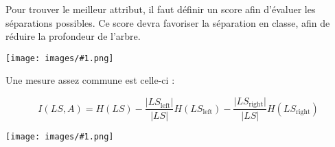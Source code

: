 \documentclass[10pt,a4paper]{report}
\newcommand{\dessin}[1]{\begin{center}\texttt{[image: images/\#1.png]}\end{center}}
\begin{document}
			Pour trouver le meilleur attribut, il faut définir un score afin d'évaluer les séparations possibles. Ce score devra favoriser la séparation en classe, afin de réduire la profondeur de l'arbre.
			
			\dessin{17}
			
			Une mesure assez commune est celle-ci :
			
			$$I(LS, A) = H(LS) - \frac{\vert LS_{\text{left}}\vert}{\vert LS\vert}H(LS_{\text{left}}) - \frac{\vert LS_{\text{right}}\vert}{\vert LS \vert}H(LS_{\text{right}})$$
			
			\dessin{18}
	
\end{document}
